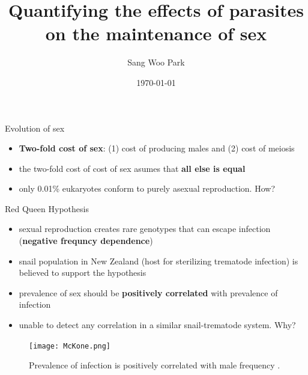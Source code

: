 \documentclass{beamer}
\title[Estimating the Red Queen]{Quantifying the effects of parasites on the maintenance of sex} %
\author{Sang Woo Park} %
\date{\today} %
\begin{document}
\begin{frame}
\titlepage %
\end{frame}

\begin{frame}{Evolution of sex}
\begin{itemize}
    \item \textbf{Two-fold cost of sex}: (1) cost of producing males and (2) cost of meiosis
    \item the two-fold cost of cost of sex asumes that \textbf{all else is equal}
    \item only 0.01\% eukaryotes conform to purely asexual reproduction. How?
\end{itemize}
\end{frame}

\begin{frame}{Red Queen Hypothesis}
\begin{minipage}[c]{0.55\textwidth}
\begin{itemize}
    \item sexual reproduction creates rare genotypes that can escape infection (\textbf{negative frequncy dependence})
    \item snail population in New Zealand (host for sterilizing trematode infection) is believed to support the hypothesis \cite{vergara2014infection}
    \item prevalence of sex should be \textbf{positively correlated} with prevalence of infection \cite{lively2001trematode}
    \item unable to detect any correlation in a similar snail-trematode system. Why? \cite{dagan2013clonal}
\end{itemize}
\end{minipage}
\begin{minipage}[c]{0.4\textwidth}
\begin{figure}
\texttt{[image: McKone.png]}
\caption{Prevalence of infection is positively correlated with male frequency \cite{mckone2016fine}.}
\vspace{-1em}
\end{figure}
\end{minipage}
\end{frame}
\end{document}
